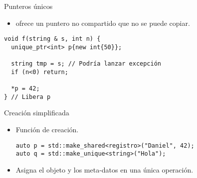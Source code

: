 \begin{frame}[t,fragile]{Punteros únicos}
\begin{itemize}
  \item {} ofrece un puntero no compartido que no se puede copiar.
\end{itemize}

\begin{lstlisting}
void f(string & s, int n) {
  unique_ptr<int> p{new int{50}};

  string tmp = s; // Podría lanzar excepción
  if (n<0) return;

  *p = 42;
} // Libera p
\end{lstlisting}
\end{frame}

\begin{frame}[t,fragile]{Creación simplificada}
\begin{itemize}
  \item Función de creación.
\begin{lstlisting}
auto p = std::make_shared<registro>("Daniel", 42);
auto q = std::make_unique<string>("Hola");
\end{lstlisting}
  \item Asigna el objeto y los meta-datos en una única operación.
\end{itemize}
\end{frame}


